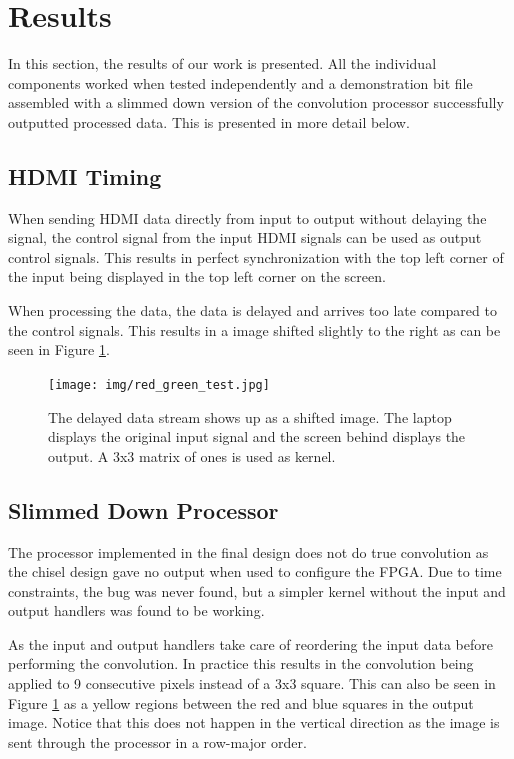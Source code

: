 \section{Results}

In this section, the results of our work is presented.
All the individual components worked when tested independently and a demonstration bit file assembled with a slimmed down version of the convolution processor successfully outputted processed data.
This is presented in more detail below.

\subsection{HDMI Timing}
When sending HDMI data directly from input to output without delaying the signal, the control signal from the input HDMI signals can be used as output control signals.
This results in perfect synchronization with the top left corner of the input being displayed in the top left corner on the screen.

When processing the data, the data is delayed and arrives too late compared to the control signals. This results in a image shifted slightly to the right as can be seen in Figure \ref{fig:SyncDelay}.

\begin{figure}
    \centering
    \texttt{[image: img/red\_green\_test.jpg]}
    \caption{
        The delayed data stream shows up as a shifted image.
        The laptop displays the original input signal and the screen behind displays the output.
        A 3x3 matrix of ones is used as kernel.
    }
    \label{fig:SyncDelay}
\end{figure}

\subsection{Slimmed Down Processor}
The processor implemented in the final design does not do true convolution as the chisel design gave no output when used to configure the FPGA.
Due to time constraints, the bug was never found, but a simpler kernel without the input and output handlers was found to be working.

As the input and output handlers take care of reordering the input data before performing the convolution.
In practice this results in the convolution being applied to 9 consecutive pixels instead of a 3x3 square.
This can also be seen in Figure \ref{fig:SyncDelay} as a yellow regions between the red and blue squares in the output image.
Notice that this does not happen in the vertical direction as the image is sent through the processor in a row-major order.

